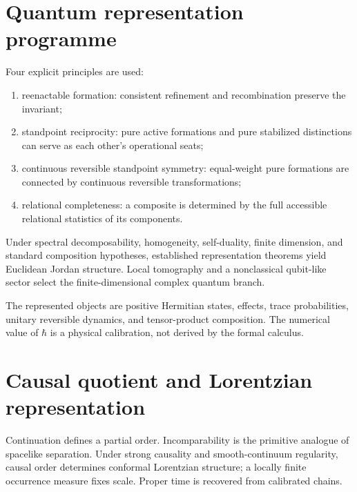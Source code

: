 \documentclass[11pt,a4paper]{article}
\begin{document}
\section{Quantum representation programme}
Four explicit principles are used:
\begin{enumerate}
\item reenactable formation: consistent refinement and recombination preserve the invariant;
\item standpoint reciprocity: pure active formations and pure stabilized distinctions can serve as each other's operational seats;
\item continuous reversible standpoint symmetry: equal-weight pure formations are connected by continuous reversible transformations;
\item relational completeness: a composite is determined by the full accessible relational statistics of its components.
\end{enumerate}
Under spectral decomposability, homogeneity, self-duality, finite dimension, and standard composition hypotheses, established representation theorems yield Euclidean Jordan structure. Local tomography and a nonclassical qubit-like sector select the finite-dimensional complex quantum branch.


The represented objects are positive Hermitian states, effects, trace probabilities, unitary reversible dynamics, and tensor-product composition. The numerical value of $\hbar$ is a physical calibration, not derived by the formal calculus.

\section{Causal quotient and Lorentzian representation}
Continuation defines a partial order. Incomparability is the primitive analogue of spacelike separation. Under strong causality and smooth-continuum regularity, causal order determines conformal Lorentzian structure; a locally finite occurrence measure fixes scale. Proper time is recovered from calibrated chains.

\end{document}
